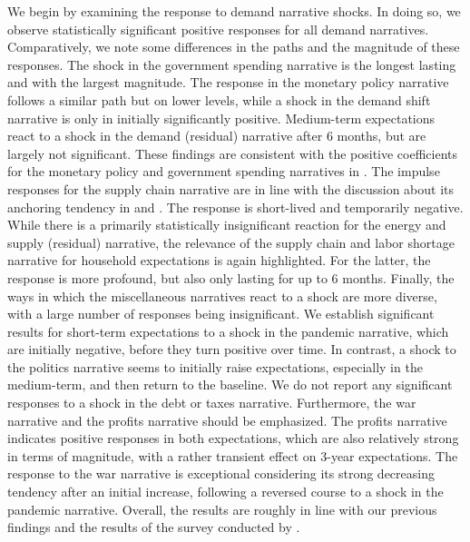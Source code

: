 We begin by examining the response to demand narrative shocks. In doing so, we observe statistically significant positive responses for all demand narratives. Comparatively, we note some differences in the paths and the magnitude of these responses. The shock in the government spending narrative is the longest lasting and with the largest magnitude. The response in the monetary policy narrative follows a similar path but on lower levels, while a shock in the demand shift narrative is only in initially significantly positive. Medium-term expectations react to a shock in the demand (residual) narrative after 6 months, but are largely not significant. These findings are consistent with the positive coefficients for the monetary policy and government spending narratives in \cite{Andre.2023}. The impulse responses for the supply chain narrative are in line with the discussion about its anchoring tendency in \cite{Andre.2023} and \cite{Demgensky.2023}. The response is short-lived and temporarily negative. While there is a primarily statistically insignificant reaction for the energy and supply (residual) narrative, the relevance of the supply chain and labor shortage narrative for household expectations is again highlighted. For the latter, the response is more profound, but also only lasting for up to 6 months. Finally, the ways in which the miscellaneous narratives react to a shock are more diverse, with a large number of responses being insignificant. We establish significant results for short-term expectations to a shock in the pandemic narrative, which are initially negative, before they turn positive over time. In contrast, a shock to the politics narrative seems to initially raise expectations, especially in the medium-term, and then return to the baseline. We do not report any significant responses to a shock in the debt or taxes narrative. Furthermore, the war narrative and the profits narrative should be emphasized. The profits narrative indicates positive responses in both expectations, which are also relatively strong in terms of magnitude, with a rather transient effect on 3-year expectations. The response to the war narrative is exceptional considering its strong decreasing tendency after an initial increase, following a reversed course to a shock in the pandemic narrative. Overall, the results are roughly in line with our previous findings and the results of the survey conducted by \cite{Andre.2023, Stantcheva.2024, Demgensky.2023}. 



